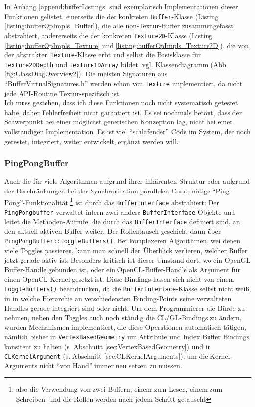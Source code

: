 	In Anhang \ref{append:bufferListings} sind exemplarisch Implementationen dieser Funktionen 
	gelistet, einerseits die der konkreten \lstinline|Buffer|-Klasse (Listing \ref{listing:bufferOpImpls_Buffer}),
	 die alle non-Textur-Buffer zusammengefasst abstrahiert, 
	andererseits die der konkreten \lstinline|Texture2D|-Klasse 
	(Listing \ref{listing:bufferOpImpls_Texture} und \ref{listing:bufferOpImpls_Texture2D}), 
	die von der abstrakten \lstinline|Texture|-Klasse erbt und selbst die Basisklasse für
	\lstinline|Texture2DDepth| und \lstinline|Texture1DArray| bildet, 
	vgl. Klassendiagramm (Abb. \ref{fig:ClassDiagOverview2}). Die meisten Signaturen aus "`BufferVirtualSignatures.h"'
	werden schon von \lstinline|Texture| implementiert, da nicht jede API-Routine Textur-spezifisch ist.\\
	Ich muss gestehen, dass ich diese Funktionen noch nicht systematisch getestet habe, daher Fehlerfreiheit nicht 
	garantiert ist. Es sei nochmals betont, dass der Schwerpunkt bei einer möglichst generischen Konzeption lag,
	nicht bei einer vollständigen Implementation. Es ist viel "`schlafender"' Code im System, der noch getestet, 
	integriert, weiter entwickelt, ergänzt werden will.
	
	\subsubsection{PingPongBuffer}
	Auch die für viele Algorithmen aufgrund ihrer inhärenten Struktur oder aufgrund der Beschränkungen bei der 	
	Synchronisation parallelen Codes nötige "`Ping-Pong"'-Funktionalität \footnote{also die Verwendung von zwei Buffern, 
	einem zum Lesen, einem zum Schreiben, und die Rollen werden nach jedem Schritt getauscht} ist durch das
	\lstinline|BufferInterface| abstrahiert: Der \lstinline|PingPongbuffer| verwaltet intern zwei andere
	\lstinline|BufferInterface|-Objekte und leitet die Methoden-Aufrufe, die durch das \lstinline|BufferInterface| 
	definiert sind,	an den aktuell aktiven Buffer weiter. Der Rollentausch geschieht dann über 
	\lstinline|PingPongBuffer::toggleBuffers()|.
	Bei komplexeren Algorithmen, wei denen viele Toggles passieren, kann man schnell den Überblick verlieren, welcher
	Buffer jetzt gerade aktiv ist; Besonders kritisch ist dieser Umstand dort, wo ein OpenGL Buffer-Handle
	gebunden ist, oder ein OpenCL-Buffer-Handle als Argument für einen OpenCL-Kernel gesetzt ist.
	Diese Bindings lassen sich nicht von einem \lstinline|toggleBuffers()| beeindrucken, 
	da die \lstinline|BufferInterface|-Klasse selbst nicht weiß, in in welche Hierarchie an verschiedensten Binding-Points
	seine verwalteten Handles gerade integriert sind oder nicht.
	Um dem Programmierer die Bürde zu nehmen, neben den Toggles auch noch ständig die CL/GL-Bindings zu ändern,
	wurden Mechanismen implementiert, die diese Operationen automatisch tätigen, nämlich bisher in 
	\lstinline|VertexBasedGeometry| um Attribute und Index Buffer Bindings konsitent zu halten 
	(s. Abschnitt \ref{sec:VertexBasedGeometry}) und in
	\lstinline|CLKernelArgument| (s. Abschnitt \ref{sec:CLKernelArguments}), um die Kernel-Arguments nicht "`von Hand"'
	immer neu setzen zu müssen.
	